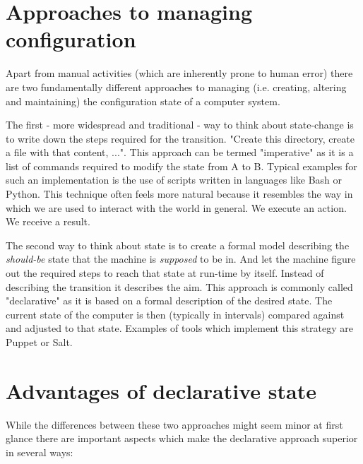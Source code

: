 \documentclass[12pt, a4paper]{article}
\begin{document}
\section{Approaches to managing configuration}
Apart from manual activities (which are inherently prone to human error) there are two fundamentally different approaches to managing (i.e. creating, altering and maintaining) the configuration state of a computer system.

The first - more widespread and traditional - way to think about state-change is to write down the steps required for the transition. "Create this directory, create a file with that content, ...". This approach can be termed "imperative" as it is a list of commands required to modify the state from A to B. Typical examples for such an implementation is the use of scripts written in languages like Bash or Python. This technique often feels more natural because it resembles the way in which we are used to interact with the world in general. We execute an action. We receive a result.

The second way to think about state is to create a formal model describing the \textit{should-be} state that the machine is \textit{supposed} to be in. And let the machine figure out the required steps to reach that state at run-time by itself. Instead of describing the transition it describes the aim. This approach is commonly called "declarative" as it is based on a formal description of the desired state. The current state of the computer is then (typically in intervals) compared against and adjusted to that state. Examples of tools which implement this strategy are Puppet or Salt.

\section{Advantages of declarative state}
While the differences between these two approaches might seem minor at first glance there are important aspects which make the declarative approach superior in several ways:
\end{document}
